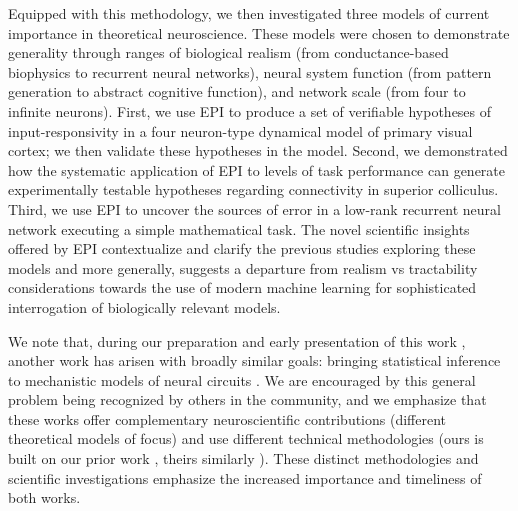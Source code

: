 \documentclass[11pt]{article}
\begin{document}
Equipped with this methodology, we then investigated three models of current importance in theoretical neuroscience.
These models were chosen to demonstrate generality through ranges of biological realism (from conductance-based biophysics to recurrent neural networks), neural system function (from pattern generation to abstract cognitive function), and network scale (from four to infinite neurons).
First, we use EPI to produce a set of verifiable hypotheses of input-responsivity in a four neuron-type dynamical model of primary visual cortex; we then validate these hypotheses in the model.
Second, we demonstrated how the systematic application of EPI to levels of task performance can generate experimentally testable hypotheses regarding connectivity in superior colliculus.  
Third, we use EPI to uncover the sources of error in a low-rank recurrent neural network executing a simple mathematical task.  
The novel scientific insights offered by EPI contextualize and clarify the previous studies exploring these models \cite{gutierrez2013multiple, litwin2016inhibitory, duan2018collicular, mastrogiuseppe2018linking} and more  generally, suggests a departure from realism vs tractability considerations towards the use of modern machine learning for sophisticated interrogation of biologically relevant models.



We note that, during our preparation and early presentation of this work \cite{bittner2019degenerate, bittner2019examining}, another work has arisen with broadly similar goals: bringing statistical inference to mechanistic models of neural circuits \cite{lueckmann2019amortised}.  
We are encouraged by this general problem being recognized by others in the community, and we emphasize that these works offer complementary neuroscientific contributions (different theoretical models of focus) and use different technical methodologies (ours is built on our prior work \cite{loaiza2017maximum}, theirs similarly \cite{LueckmannGoncalves_17}).
These distinct methodologies and scientific investigations emphasize the increased importance and timeliness of both works. 
\end{document}
